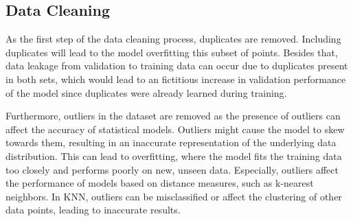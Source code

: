\documentclass[conference]{IEEEtran}
\begin{document}
\subsection{Data Cleaning}

As the first step of the data cleaning process, duplicates are removed. Including duplicates will lead to the model overfitting this subset of points. Besides that, data leakage from validation to training data can occur  due to duplicates present in both sets, which would lead to an fictitious increase in validation performance of the model since duplicates were already learned during training.

Furthermore, outliers in the dataset are removed as the presence of outliers can affect the accuracy of statistical models. Outliers might cause the model to skew towards them, resulting in an inaccurate representation of the underlying data distribution. This can lead to overfitting, where the model fits the training data too closely and performs poorly on new, unseen data. Especially, outliers affect the performance of models based on distance measures, such as k-nearest neighbors. In KNN, outliers can be misclassified or affect the clustering of other data points, leading to inaccurate results.
\end{document}
